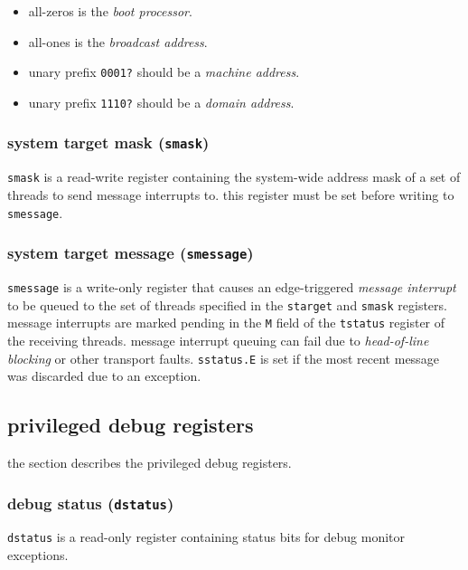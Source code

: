 \begin{itemize}[itemsep=0pt]
\item all-zeros is the \emph{boot processor}.
\item all-ones is the \emph{broadcast address}.
\item unary prefix \texttt{0001?} should be a \emph{machine address}.
\item unary prefix \texttt{1110?} should be a \emph{domain address}.
\end{itemize}


\subsubsection{system target mask (\texttt{smask})}
\texttt{smask} is a read-write register containing the system-wide
address mask of a set of threads to send message interrupts to.
this register must be set before writing to \texttt{smessage}.
\\

\subsubsection{system target message (\texttt{smessage})}
\texttt{smessage} is a write-only register that causes an edge-triggered
\emph{message interrupt} to be queued to the set of threads specified in
the \texttt{starget} and \texttt{smask} registers. message interrupts are
marked pending in the \texttt{M} field of the \texttt{tstatus} register
of the receiving threads. message interrupt queuing can fail due to
\emph{head-of-line blocking} or other transport faults. \texttt{sstatus.E}
is set if the most recent message was discarded due to an exception.
\\

\newpage
\subsection{privileged debug registers}
the section describes the privileged debug registers.

\subsubsection{debug status (\texttt{dstatus})}
\texttt{dstatus} is a read-only register containing status bits for debug
monitor exceptions.
\\

